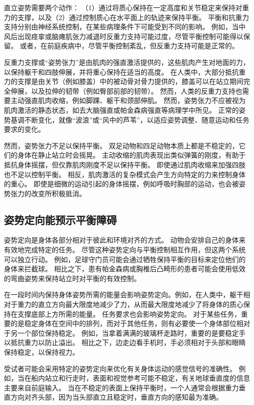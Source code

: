 直立姿势需要两个动作：
（1）通过将质心保持在一定高度和关节稳定来保持对重力的支撑，以及（2）通过控制质心在水平面上的轨迹来保持平衡。
平衡和抗重力支持分别由神经系统控制，在某些病理条件下可能受到不同的影响。
例如，当中风后出现痉挛或脑瘫肌张力减退时反重力支持可能过度，尽管平衡控制可能得以保留。
或者，在前庭疾病中，尽管平衡控制紊乱，但反重力支持可能是正常的。


反重力支撑或“姿势张力”是由肌肉的强直激活提供的，这些肌肉产生对地面的力，以保持躯干和四肢伸展，并将重心保持在适当的高度。
在人类中，大部分抵抗重力的支撑是由关节（例如膝盖）中的被动骨对骨力提供的，膝盖可以在站立期间完全伸展，以及拉伸的韧带（例如臀部前部的韧带）。
然而，人类的反重力支持也需要主动强直肌肉收缩，例如脚踝、躯干和颈部伸肌。
然而，姿势张力不应被视为肌肉激活的静态状态，如去大脑强直或帕金森病强直等病理学中所见。
正常的姿势基调不断变化，就像“波浪”或“风中的芦苇”，以适应姿势调整、随意运动和任务要求的变化。


然而，姿势张力不足以保持平衡。
双足动物和四足动物本质上都是不稳定的，它们的身体在静止站立时会摇晃。
主动收缩的肌肉表现出类似弹簧的刚度，有助于抵抗身体摇摆，但仅靠肌肉刚度不足以保持平衡。
即使通过肌肉收缩来加强四肢也不足以控制平衡。
相反，肌肉激活的复杂模式会产生方向特定的力来控制身体的重心。
即使是细微的运动引起的身体摇摆，例如呼吸时胸部的运动，也会被姿势张力的改变所积极抵消。



\subsection{姿势定向能预示平衡障碍}

姿势定向是身体各部分相对于彼此和环境对齐的方式。 动物会安排自己的身体来有效地完成特定的任务。
尽管这种姿势定向与平衡控制相互作用，但这两个系统可以独立行动。
例如，足球守门员可能会通过牺牲保持平衡的目标来定位他们的身体来拦截球。
相比之下，患有帕金森病或胸椎后凸畸形的患者可能会使用低效的弯曲姿势来保持站立时对平衡的有效控制。


在一段时间内保持身体姿势所需的能量会影响姿势定向。例如，在人类中，躯干相对于重力的直立方向最大限度地减少了力，从而最大限度地减少了将身体的质心保持在支撑底部上方所需的能量。
任务要求也会影响姿势定向。
对于某些任务，重要的是稳定身体在空间中的排列，而对于其他任务，则有必要使一个身体部位相对于另一个部位保持稳定。
例如，当拿着满满的玻璃杯走路时，重要的是要稳定手以抵抗重力以防止溢出。
相比之下，边走边看手机时，手必须相对于头部和眼睛保持稳定，以保持视力。


受试者可能会采用特定的姿势定向来优化有关身体运动的感觉信号的准确性。
例如，当在船内站立和行走时，表面和视觉参考可能不稳定，有关地球垂直度的信息主要来自前庭输入。
当在不稳定的表面上保持平衡时，一个人通常会根据重力垂直方向对齐头部，因为当头部直立且稳定时，垂直方向的感知最为准确。


